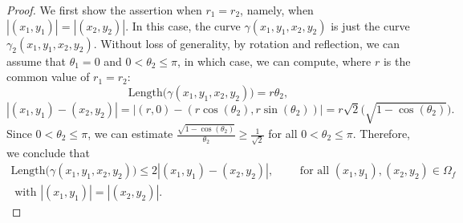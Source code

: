\documentclass[11pt]{article}
\theoremstyle{definition}
\begin{document}
\begin{proof}
We first show the assertion when $r_{1} = r_{2}$, namely, when $|(x_{1}, y_{1})| = |(x_{2}, y_{2})|$. In this case, the curve $\gamma(x_{1}, y_{1}, x_{2}, y_{2})$ is just the curve $\gamma_{2}(x_{1}, y_{1}, x_{2}, y_{2})$. Without loss of generality, by rotation and reflection, we can assume that $\theta_{1} = 0$ and $0 < \theta_{2} \le \pi$, in which case, we can compute, where $r$ is the common value of $r_{1} = r_{2}$:
\begin{equation*}
\text{Length}\Big(\gamma(x_{1}, y_{1}, x_{2}, y_{2})\Big) = r\theta_{2}, 
\end{equation*}
\begin{equation*}
|(x_{1}, y_{1}) - (x_{2}, y_{2})| = |(r, 0) - (r\cos(\theta_{2}), r\sin(\theta_{2}))| = r\sqrt{2}\Big(\sqrt{1 - \cos(\theta_{2})}\Big).
\end{equation*}
Since $0 < \theta_{2} \le \pi$, we can estimate $\displaystyle \frac{\sqrt{1 - \cos(\theta_{2})}}{\theta_{2}} \ge \frac{1}{\sqrt{2}}$ for all $0 < \theta_{2} \le \pi$. Therefore, we conclude that
\begin{multline}\label{gammalengthr}
\text{Length}\Big(\gamma(x_{1}, y_{1}, x_{2}, y_{2})\Big) \le 2|(x_{1}, y_{1}) - (x_{2}, y_{2})|, \qquad \text{ for all } (x_{1}, y_{1}), (x_{2}, y_{2}) \in \Omega_{f} \\
\text{ with } |(x_{1}, y_{1})| = |(x_{2}, y_{2})|.
\end{multline}


\end{proof}
\end{document}
